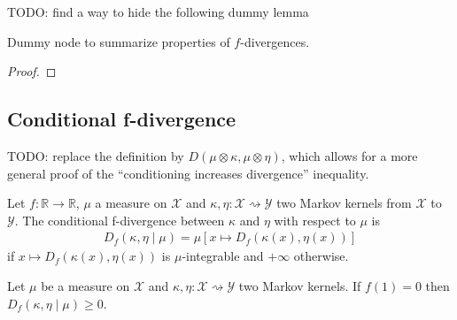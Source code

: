 TODO: find a way to hide the following dummy lemma
\begin{lemma}
  \label{lem:fDiv_properties}
  \leanok
  Dummy node to summarize properties of $f$-divergences.
\end{lemma}

\begin{proof}\leanok
{}
\end{proof}


\subsection{Conditional f-divergence}

TODO: replace the definition by $D(\mu \otimes \kappa, \mu \otimes \eta)$, which allows for a more general proof of the ``conditioning increases divergence'' inequality.

\begin{definition}
  \label{def:condFDiv}
  \leanok
  Let $f : \mathbb{R} \to \mathbb{R}$, $\mu$ a measure on $\mathcal X$ and $\kappa, \eta : \mathcal X \rightsquigarrow \mathcal Y$ two Markov kernels from $\mathcal X$ to $\mathcal Y$. The conditional f-divergence between $\kappa$ and $\eta$ with respect to $\mu$ is
  \begin{align*}
  D_f(\kappa, \eta \mid \mu) = \mu\left[x \mapsto D_f(\kappa(x), \eta(x))\right]
  \end{align*}
  if $x \mapsto D_f(\kappa(x), \eta(x))$ is $\mu$-integrable and $+\infty$ otherwise.
\end{definition}


\begin{lemma}
  \label{lem:condFDiv_nonneg}
  \leanok
  Let $\mu$ be a measure on $\mathcal X$ and $\kappa, \eta : \mathcal X \rightsquigarrow \mathcal Y$ two Markov kernels. If $f(1) = 0$ then $D_f(\kappa, \eta \mid \mu) \ge 0$.
\end{lemma}

